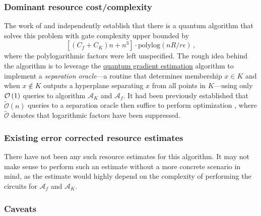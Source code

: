 \begin{refsection}
\subsubsection*{Dominant resource cost/complexity}
The work of \cite{chakrabarti2018QuantumConvexOpt} and \cite{apeldoorn2018ConvexOptUsingQuantumOracles} independently establish that there is a quantum algorithm that solves this problem with gate complexity upper bounded  by
\begin{equation}
    \left[(C_f + C_K)n +n^3\right]\cdot \text{polylog}(nR/r\epsilon)\,,
\end{equation}
where the polylogarithmic factors were left unspecified. The rough idea behind the algorithm is to leverage the \hyperref[prim:GradientEstimation]{quantum gradient estimation} algorithm to implement a \emph{separation oracle}---a routine that determines membership $x\in K$ and when $x \not\in K$ outputs a hyperplane separating $x$ from all points in $K$---using only $\mathcal{O}\left( 1 \right)$ queries to algorithm $\mathcal{A}_K$ and $\mathcal{A}_f$. It had been previously established that $\tilde{\mathcal{O}}(n)$ queries to a separation oracle then suffice to perform optimization \cite{lee2015FasterCuttingPlaneConvexOpt}, where $\tilde{\mathcal{O}}$ denotes that logarithmic factors have been suppressed. 

\subsubsection*{Existing error corrected resource estimates}

There have not been any such resource estimates for this algorithm. It may not make sense to perform such an estimate without a more concrete scenario in mind, as the estimate would highly depend on the complexity of performing the circuits for $\mathcal{A}_f$ and $\mathcal{A}_K$. 

\subsubsection*{Caveats}


\end{refsection}
